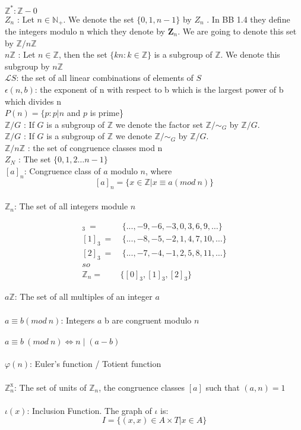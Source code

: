 \documentclass[12pt]{amsart}
\theoremstyle{definition}
\newcommand{\mbZ}{\mathbb{Z}}
\begin{document}
 

$\mathbb{Z}^* : \mathbb{Z} - {0}$
\\
$Z_n$ : Let $n \in \mathbb{N}_+$. We denote the set
$\{0, 1, n - 1\}$ by $Z_n$ . In BB 1.4 they define the integers modulo n which
they denote by $\textbf{Z}_n$. We are going to denote this set by $\mathbb{Z}/n\mathbb{Z}$
\\
$n\mathbb{Z}$ : Let $n \in \mathbb{Z}$, then the set $\{kn : k \in \mathbb{Z}\}$ is a subgroup of $\mathbb{Z}$. We denote this subgroup by $n\mathbb{Z}$
\\
$\mathcal{L}S$: the set of all linear combinations of elements of $S$
\\
$\epsilon (n, b)$: the exponent of n with respect to b which is the largest power
of b which divides n
\\
$P (n) = \{p : p|n$ and $p$ is prime\}
\\
$\mathbb{Z}/G$ : If $G$ is a subgroup of $\mathbb{Z}$ we denote the factor set $\mathbb{Z}/\sim_G$ by $\mathbb{Z}/G$.
\\
$\mathbb{Z}/G$ : If $G$ is a subgroup of $\mathbb{Z}$ we denote $\mathbb{Z}/\sim_G$ by $\mathbb{Z}/G$.
\\
$\mathbb{Z}/n\mathbb{Z}$ : the set of congruence classes mod n
\\
$Z_N$ : The set $\{0,1,2 \dots n-1\}$
\\

$[a]_n$: Congruence class of $a$ modulo $n$, where
$$[a]_n = \{x \in \mbZ | x \equiv a (mod\ n)\}$$
\\
$\mbZ_n$: The set of all integers module $n$
\begin{center}
\begin{align*}
[0]_3 \ =& \ \{..., -9, -6, -3, 0, 3, 6, 9, \dots\}\\
[1]_3 \ =& \ \{..., -8, -5, -2, 1, 4, 7, 10, \dots\}\\
[2]_3 \ =& \ \{..., -7, -4, -1, 2, 5, 8, 11, \dots\}\\
so\\
\mbZ_n =& \{ [0]_3, [1]_3, [2]_3 \}
\end{align*}
\end{center}

$a\mbZ$:  The set of all multiples of an integer $a$
\\
\\
$a \equiv b(mod \ n)$: Integers $a$ b are congruent modulo $n$
\\
\\
$a \equiv b\ (mod\ n) \Leftrightarrow n \mid (a-b)$
\\
\\
$\varphi(n)$: Euler's function / Totient function
\\
\\
$\mbZ_n^\text{x}$: The set of units of $\mbZ_n$, the congruence classes $[a]$ such that $(a,n) = 1$ 
\\
\\
$\iota(x)$: Inclusion Function.  The graph of $\iota$ is:
$$I = \{(x,x) \in A \times T | x \in A \}$$
\end{document}
